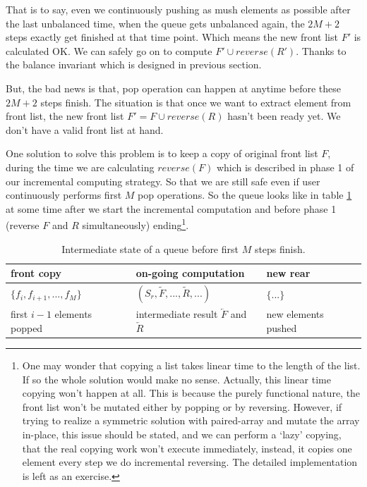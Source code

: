 \documentclass[UTF8]{article}
\begin{document}
That is to say, even we continuously pushing as mush elements as possible after
the last unbalanced time, when the queue gets unbalanced again, the $2M+2$ steps
exactly get finished at that time point. Which means the new front list $F'$ is
calculated OK. We can safely go on to compute $F' \cup reverse(R')$. Thanks to the
balance invariant which is designed in previous section.

But, the bad news is that, pop operation can happen at anytime before these
$2M+2$ steps finish. The situation is that once we want to extract element
from front list, the new front list $F' = F \cup reverse(R)$ hasn't been
ready yet. We don't have a valid front list at hand.

One solution to solve this problem is to keep a copy of original front list $F$,
during the time we are calculating $reverse(F)$ which is described in phase 1 of
our incremental computing strategy. So that we are still safe even if user
continuously performs first $M$ pop operations. So the queue looks like
in table \ref{tab:pop-before-m} at some time after we start the incremental computation and before
phase 1 (reverse $F$ and $R$ simultaneously) ending\footnote{One may wonder that copying
a list takes linear time to the length of the list. If so the whole solution
would make no sense. Actually, this linear time copying won't happen at all.
This is because the purely functional nature, the front list won't be mutated
either by popping or by reversing. However, if trying to realize a symmetric
solution with paired-array and mutate the array in-place, this issue should be stated, and
we can perform a `lazy' copying, that the real copying
work won't execute immediately, instead, it copies one element every step we
do incremental reversing. The detailed implementation is left as an exercise.}.

\begin{table}
\centering
\begin{tabular}{l l l}
  front copy & on-going computation & new rear \\
  \hline
  $\{ f_i, f_{i+1}, ..., f_M \}$ & $(S_r, \tilde{F}, ..., \tilde{R}, ...)$ & $ \{ ... \}$ \\
  first $i-1$ elements popped & intermediate result $\overleftarrow{F}$ and $\overleftarrow{R}$ & new elements pushed
\end{tabular}
\caption{Intermediate state of a queue before first $M$ steps finish.}
\label{tab:pop-before-m}
\end{table}
\end{document}
